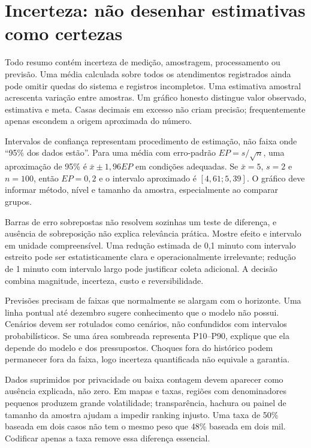 \section{Incerteza: não desenhar estimativas como certezas}

Todo resumo contém incerteza de medição, amostragem, processamento ou previsão. Uma média calculada sobre todos os atendimentos registrados ainda pode omitir quedas do sistema e registros incompletos. Uma estimativa amostral acrescenta variação entre amostras. Um gráfico honesto distingue valor observado, estimativa e meta. Casas decimais em excesso não criam precisão; frequentemente apenas escondem a origem aproximada do número.

Intervalos de confiança representam procedimento de estimação, não faixa onde ``95\% dos dados estão''. Para uma média com erro-padrão $EP=s/\sqrt{n}$, uma aproximação de 95\% é $\bar{x}\pm1{,}96EP$ em condições adequadas. Se $\bar{x}=5$, $s=2$ e $n=100$, então $EP=0{,}2$ e o intervalo aproximado é $[4{,}61;5{,}39]$. O gráfico deve informar método, nível e tamanho da amostra, especialmente ao comparar grupos.

Barras de erro sobrepostas não resolvem sozinhas um teste de diferença, e ausência de sobreposição não explica relevância prática. Mostre efeito e intervalo em unidade compreensível. Uma redução estimada de 0,1 minuto com intervalo estreito pode ser estatisticamente clara e operacionalmente irrelevante; redução de 1 minuto com intervalo largo pode justificar coleta adicional. A decisão combina magnitude, incerteza, custo e reversibilidade.

Previsões precisam de faixas que normalmente se alargam com o horizonte. Uma linha pontual até dezembro sugere conhecimento que o modelo não possui. Cenários devem ser rotulados como cenários, não confundidos com intervalos probabilísticos. Se uma área sombreada representa P10--P90, explique que ela depende do modelo e dos pressupostos. Choques fora do histórico podem permanecer fora da faixa, logo incerteza quantificada não equivale a garantia.

Dados suprimidos por privacidade ou baixa contagem devem aparecer como ausência explicada, não zero. Em mapas e taxas, regiões com denominadores pequenos produzem grande volatilidade; transparência, hachura ou painel de tamanho da amostra ajudam a impedir ranking injusto. Uma taxa de 50\% baseada em dois casos não tem o mesmo peso que 48\% baseada em dois mil. Codificar apenas a taxa remove essa diferença essencial.

